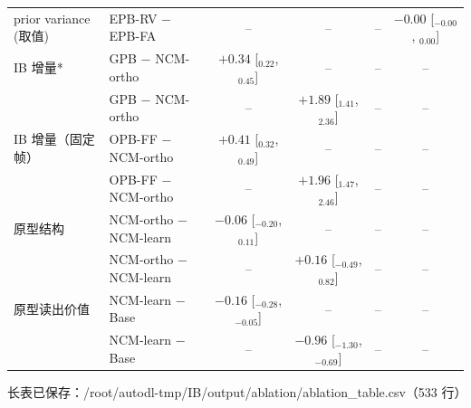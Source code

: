 \begin{tabular}{l l c c c c}
prior variance (取值) & EPB-RV − EPB-FA & -- & -- & -- & $-0.00$ [$_{-0.00}$, $_{0.00}$] \\
IB 增量* & GPB − NCM-ortho & $+0.34$ [$_{0.22}$, $_{0.45}$] & -- & -- & -- \\
 & GPB − NCM-ortho & -- & $+1.89$ [$_{1.41}$, $_{2.36}$] & -- & -- \\
IB 增量（固定帧） & OPB-FF − NCM-ortho & $+0.41$ [$_{0.32}$, $_{0.49}$] & -- & -- & -- \\
 & OPB-FF − NCM-ortho & -- & $+1.96$ [$_{1.47}$, $_{2.46}$] & -- & -- \\
原型结构 & NCM-ortho − NCM-learn & $-0.06$ [$_{-0.20}$, $_{0.11}$] & -- & -- & -- \\
 & NCM-ortho − NCM-learn & -- & $+0.16$ [$_{-0.49}$, $_{0.82}$] & -- & -- \\
原型读出价值 & NCM-learn − Base & $-0.16$ [$_{-0.28}$, $_{-0.05}$] & -- & -- & -- \\
 & NCM-learn − Base & -- & $-0.96$ [$_{-1.30}$, $_{-0.69}$] & -- & -- \\
\hline
\end{tabular}

长表已保存：/root/autodl-tmp/IB/output/ablation/ablation_table.csv（533 行）
